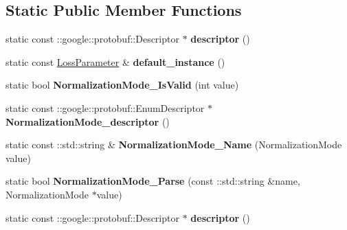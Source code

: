 \subsection*{Static Public Member Functions}
\begin{DoxyCompactItemize}
\item 
\mbox{\label{classcaffe_1_1_loss_parameter_ae013d7911ce6e9e6909f14bd444eb8f4}} 
static const \+::google\+::protobuf\+::\+Descriptor $\ast$ {\bfseries descriptor} ()
\item 
\mbox{\label{classcaffe_1_1_loss_parameter_accc040412ed310d6c305f0ac26e7d9d0}} 
static const \mbox{\hyperlink{classcaffe_1_1_loss_parameter}{Loss\+Parameter}} \& {\bfseries default\+\_\+instance} ()
\item 
\mbox{\label{classcaffe_1_1_loss_parameter_ac00c1485d27b372cdda9f919c56886a6}} 
static bool {\bfseries Normalization\+Mode\+\_\+\+Is\+Valid} (int value)
\item 
\mbox{\label{classcaffe_1_1_loss_parameter_ac799971e862be927b7fa88c0629935ec}} 
static const \+::google\+::protobuf\+::\+Enum\+Descriptor $\ast$ {\bfseries Normalization\+Mode\+\_\+descriptor} ()
\item 
\mbox{\label{classcaffe_1_1_loss_parameter_a6b00a95e58e6f5c349e6b5c8baaa3844}} 
static const \+::std\+::string \& {\bfseries Normalization\+Mode\+\_\+\+Name} (Normalization\+Mode value)
\item 
\mbox{\label{classcaffe_1_1_loss_parameter_ac4ab06a8bb0ae5c425e4a735970ccdef}} 
static bool {\bfseries Normalization\+Mode\+\_\+\+Parse} (const \+::std\+::string \&name, Normalization\+Mode $\ast$value)
\item 
\mbox{\label{classcaffe_1_1_loss_parameter_aa8326f83be91f4961d9c4c5f6daa43f0}} 
static const \+::google\+::protobuf\+::\+Descriptor $\ast$ {\bfseries descriptor} ()
\item 
\mbox{\label{classcaffe_1_1_loss_parameter_a07e1e12c7afd33e86a33f876fb558403}} 

\end{DoxyCompactItemize}
